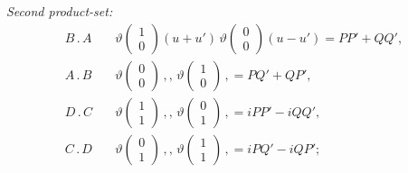 \documentclass[11pt]{article}
\begin{document}
\textit{Second product-set:}
\begin{align*}
B\mathbin{.}A\quad &\vartheta\!\begin{pmatrix} 1 \\ 0 \end{pmatrix}\!(u + u')\,\vartheta\!\begin{pmatrix} 0 \\ 0 \end{pmatrix}\!(u - u') = PP' + QQ',\\
A\mathbin{.}B\quad &\vartheta\!\begin{pmatrix} 0 \\ 0 \end{pmatrix}\,,,\,\vartheta\!\begin{pmatrix} 1 \\ 0 \end{pmatrix}\,, = PQ' + QP',\\
D\mathbin{.}C\quad &\vartheta\!\begin{pmatrix} 1 \\ 1 \end{pmatrix}\,,,\,\vartheta\!\begin{pmatrix} 0 \\ 1 \end{pmatrix}\,, = iPP' - iQQ',\\
C\mathbin{.}D\quad &\vartheta\!\begin{pmatrix} 0 \\ 1 \end{pmatrix}\,,,\,\vartheta\!\begin{pmatrix} 1 \\ 1 \end{pmatrix}\,, = iPQ' - iQP';
\end{align*}
\end{document}
